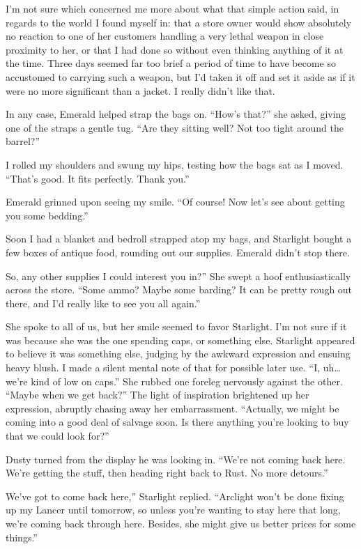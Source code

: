 I’m not sure which concerned me more about what that simple action said, in regards to the world I found myself in: that a store owner would show absolutely no reaction to one of her customers handling a very lethal weapon in close proximity to her, or that I had done so without even thinking anything of it at the time. Three days seemed far too brief a period of time to have become so accustomed to carrying such a weapon, but I’d taken it off and set it aside as if it were no more significant than a jacket. I really didn’t like that.

In any case, Emerald helped strap the bags on. “How’s that?” she asked, giving one of the straps a gentle tug. “Are they sitting well? Not too tight around the barrel?”

I rolled my shoulders and swung my hips, testing how the bags sat as I moved. “That’s good. It fits perfectly. Thank you.”

Emerald grinned upon seeing my smile. “Of course! Now let’s see about getting you some bedding.”

Soon I had a blanket and bedroll strapped atop my bags, and Starlight bought a few boxes of antique food, rounding out our supplies. Emerald didn’t stop there.

\leavevmode{}So, any other supplies I could interest you in?” She swept a hoof enthusiastically across the store. “Some ammo? Maybe some barding? It can be pretty rough out there, and I’d really like to see you all again.”

She spoke to all of us, but her smile seemed to favor Starlight. I’m not sure if it was because she was the one spending caps, or something else. Starlight appeared to believe it was something else, judging by the awkward expression and ensuing heavy blush. I made a silent mental note of that for possible later use. “I, uh… we’re kind of low on caps.” She rubbed one foreleg nervously against the other. “Maybe when we get back?” The light of inspiration brightened up her expression, abruptly chasing away her embarrassment. “Actually, we might be coming into a good deal of salvage soon. Is there anything you’re looking to buy that we could look for?”

Dusty turned from the display he was looking in. “We’re not coming back here. We’re getting the stuff, then heading right back to Rust. No more detours.”

\leavevmode{}We’ve got to come back here,” Starlight replied. “Arclight won’t be done fixing up my Lancer until tomorrow, so unless you’re wanting to stay here that long, we’re coming back through here. Besides, she might give us better prices for some things.”


